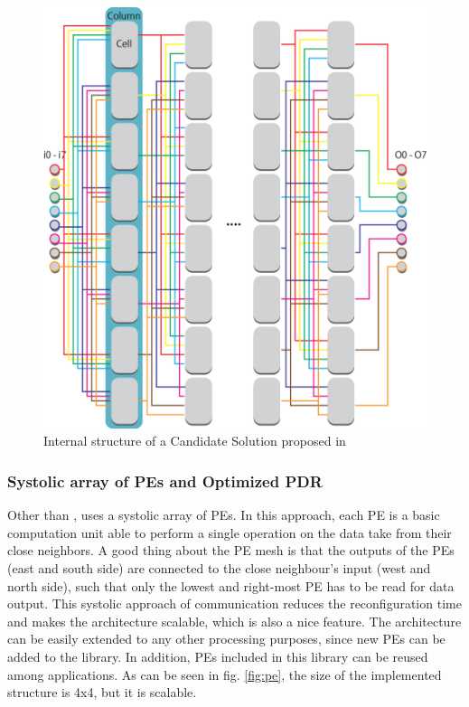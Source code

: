 \begin{figure}[htb]%
\includegraphics[width=\columnwidth]{Pictures/candidate.png}%
\caption{Internal structure of a Candidate Solution proposed in \cite{virtex4}}%
\label{fig:candidate}%
\end{figure}

\subsubsection{Systolic array of PEs and Optimized PDR}
\label{sec:PDR}
Other than \cite{virtex4}, \cite{PDR} uses a systolic array of PEs. In this approach, each PE is a basic computation unit able to perform a single operation on the data take from their close neighbors. A good thing about the PE mesh is that the outputs of the PEs (east and south side) are connected to the close neighbour's input (west and north side), such that only the lowest and right-most PE has to be read for data output. This systolic approach of communication reduces the reconfiguration time and makes the architecture scalable, which is also a nice feature. The architecture can be easily extended to any other processing purposes, since new PEs can be added to the library. In addition, PEs included in this library can be reused among applications. As can be seen in fig. \ref{fig:pe}, the size of the implemented structure is 4x4, but it is scalable. 

